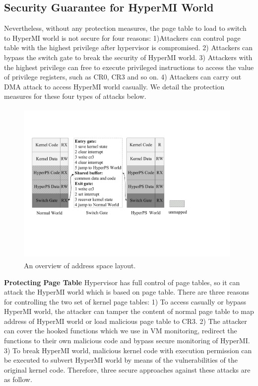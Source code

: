 \documentclass[conference]{IEEEtran}
\begin{document}
\subsection{Security Guarantee for HyperMI World}\label {SG}
Nevertheless, without any protection measures, the page table to load to switch to HyperMI world is not secure for four reasons: 1)Attackers can control page table with the highest privilege after hypervisor is compromised. 2) Attackers can bypass the switch gate to break the security of HyperMI world. 3) Attackers with the highest privilege can free to execute privileged instructions to access the value of privilege registers, such as CR0, CR3 and so on. 4) Attackers can carry out DMA attack to access HyperMI world casually.
We detail the protection measures for these four types of attacks below.

\begin{figure}
\centerline{\includegraphics[width=11cm, height=8cm]{pdfvmcs2.pdf}}%
\caption{An overview of address space layout.} \label{fig2}
\end{figure}

\textbf{Protecting Page Table}
Hypervisor has full control of page tables, so it can attack the HyperMI world which is based on page table.
There are three reasons for controlling the two set of kernel page tables: 1) To access casually or bypass HyperMI world, the attacker can tamper the content of normal page table to map address of HyperMI world or load malicious page table to CR3.
2) The attacker can cover the hooked functions which we use in VM monitoring, redirect the functions to their own malicious code and bypass secure monitoring of HyperMI. 3) To break HyperMI world, malicious kernel code with execution permission can be executed to subvert HyperMI world by means of the vulnerabilities of the original kernel code. 
Therefore, three secure approaches against these attacks are as follow.
\end{document}
